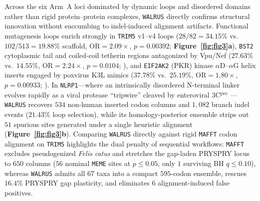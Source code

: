 \documentclass[11pt,letterpaper]{article}
\newcommand{\WALRUS}{\texttt{WALRUS}\xspace}
\newcommand{\MEME}{\texttt{MEME}\xspace}
\newcommand{\MAFFT}{\texttt{MAFFT}\xspace}
\begin{document}
Across the six Arm~A loci dominated by dynamic loops and disordered domains rather than rigid protein--protein complexes, \WALRUS directly confirms structural innovation without succumbing to indel-induced alignment artifacts. Functional mutagenesis loops enrich strongly in \texttt{TRIM5} v1--v4 loops ($28/82 = 34.15\%$ vs.\ $102/513 = 19.88\%$ scaffold, $\mathrm{OR} = 2.09\times$, $p = 0.00392$; \textbf{Figure~\ref{fig:fig3}a}), \texttt{BST2} cytoplasmic tail and coiled-coil tetherin regions antagonized by Vpu/Nef ($27.63\%$ vs.\ $14.55\%$, $\mathrm{OR} = 2.24\times$, $p = 0.0104$; \citealp{jia2009species,mcnatt2009species}), and \texttt{EIF2AK2} (PKR) kinase $\alpha$D--$\alpha$G helix inserts engaged by poxvirus K3L mimics ($37.78\%$ vs.\ $25.19\%$, $\mathrm{OR} = 1.80\times$, $p = 0.00933$; \citealp{elde2009protein}). In \texttt{NLRP1}---where an intrinsically disordered N-terminal linker evolves rapidly as a viral protease ``tripwire'' cleaved by enteroviral 3C$^{\text{pro}}$ \citep{chavarria2016proteolytic,tsu2021diverse}---\WALRUS recovers $534$ non-human inserted codon columns and $1,082$ branch indel events ($21.43\%$ loop selection), while its homology-posterior ensemble strips out $51$ spurious sites generated under a single heuristic alignment (\textbf{Figure~\ref{fig:fig3}b}). Comparing \WALRUS directly against rigid \MAFFT codon alignment on \texttt{TRIM5} highlights the dual penalty of sequential workflows: \MAFFT excludes pseudogenized \textit{Felis catus} and stretches the gap-laden PRYSPRY locus to $650$ columns ($56$ nominal \MEME sites at $p \le 0.05$, only $1$ surviving BH $q \le 0.10$), whereas \WALRUS admits all $67$ taxa into a compact $595$-codon ensemble, rescues $16.4\%$ PRYSPRY gap plasticity, and eliminates $6$ alignment-induced false positives.
\end{document}
